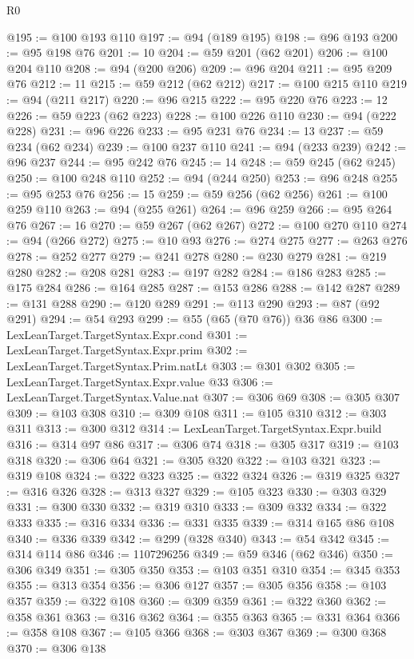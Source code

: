 \begin{lexlean}{R0}
\begin{coremodule}
@195 := @100 @193 @110
@197 := @94 (@189 @195)
@198 := @96 @193
@200 := @95 @198 @76
@201 := 10
@204 := @59 @201 (@62 @201)
@206 := @100 @204 @110
@208 := @94 (@200 @206)
@209 := @96 @204
@211 := @95 @209 @76
@212 := 11
@215 := @59 @212 (@62 @212)
@217 := @100 @215 @110
@219 := @94 (@211 @217)
@220 := @96 @215
@222 := @95 @220 @76
@223 := 12
@226 := @59 @223 (@62 @223)
@228 := @100 @226 @110
@230 := @94 (@222 @228)
@231 := @96 @226
@233 := @95 @231 @76
@234 := 13
@237 := @59 @234 (@62 @234)
@239 := @100 @237 @110
@241 := @94 (@233 @239)
@242 := @96 @237
@244 := @95 @242 @76
@245 := 14
@248 := @59 @245 (@62 @245)
@250 := @100 @248 @110
@252 := @94 (@244 @250)
@253 := @96 @248
@255 := @95 @253 @76
@256 := 15
@259 := @59 @256 (@62 @256)
@261 := @100 @259 @110
@263 := @94 (@255 @261)
@264 := @96 @259
@266 := @95 @264 @76
@267 := 16
@270 := @59 @267 (@62 @267)
@272 := @100 @270 @110
@274 := @94 (@266 @272)
@275 := @10 @93
@276 := @274 @275
@277 := @263 @276
@278 := @252 @277
@279 := @241 @278
@280 := @230 @279
@281 := @219 @280
@282 := @208 @281
@283 := @197 @282
@284 := @186 @283
@285 := @175 @284
@286 := @164 @285
@287 := @153 @286
@288 := @142 @287
@289 := @131 @288
@290 := @120 @289
@291 := @113 @290
@293 := @87 (@92 @291)
@294 := @54 @293
@299 := @55 (@65 (@70 @76)) @36 @86
@300 := LexLeanTarget.TargetSyntax.Expr.cond
@301 := LexLeanTarget.TargetSyntax.Expr.prim
@302 := LexLeanTarget.TargetSyntax.Prim.natLt
@303 := @301 @302
@305 := LexLeanTarget.TargetSyntax.Expr.value @33
@306 := LexLeanTarget.TargetSyntax.Value.nat
@307 := @306 @69
@308 := @305 @307
@309 := @103 @308
@310 := @309 @108
@311 := @105 @310
@312 := @303 @311
@313 := @300 @312
@314 := LexLeanTarget.TargetSyntax.Expr.build
@316 := @314 @97 @86
@317 := @306 @74
@318 := @305 @317
@319 := @103 @318
@320 := @306 @64
@321 := @305 @320
@322 := @103 @321
@323 := @319 @108
@324 := @322 @323
@325 := @322 @324
@326 := @319 @325
@327 := @316 @326
@328 := @313 @327
@329 := @105 @323
@330 := @303 @329
@331 := @300 @330
@332 := @319 @310
@333 := @309 @332
@334 := @322 @333
@335 := @316 @334
@336 := @331 @335
@339 := @314 @165 @86 @108
@340 := @336 @339
@342 := @299 (@328 @340)
@343 := @54 @342
@345 := @314 @114 @86
@346 := 1107296256
@349 := @59 @346 (@62 @346)
@350 := @306 @349
@351 := @305 @350
@353 := @103 @351 @310
@354 := @345 @353
@355 := @313 @354
@356 := @306 @127
@357 := @305 @356
@358 := @103 @357
@359 := @322 @108
@360 := @309 @359
@361 := @322 @360
@362 := @358 @361
@363 := @316 @362
@364 := @355 @363
@365 := @331 @364
@366 := @358 @108
@367 := @105 @366
@368 := @303 @367
@369 := @300 @368
@370 := @306 @138

\end{coremodule}
\end{lexlean}
